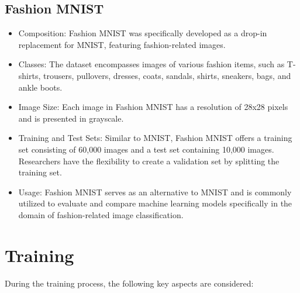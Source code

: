 \documentclass{midl} %
\begin{document}
\subsection{Fashion MNIST}
\begin{itemize}
  \item Composition: Fashion MNIST was specifically developed as a drop-in replacement for MNIST, featuring fashion-related images.
  \item Classes: The dataset encompasses images of various fashion items, such as T-shirts, trousers, pullovers, dresses, coats, sandals, shirts, sneakers, bags, and ankle boots.
  \item Image Size: Each image in Fashion MNIST has a resolution of 28x28 pixels and is presented in grayscale.
  \item Training and Test Sets: Similar to MNIST, Fashion MNIST offers a training set consisting of 60,000 images and a test set containing 10,000 images. Researchers have the flexibility to create a validation set by splitting the training set.
  \item Usage: Fashion MNIST serves as an alternative to MNIST and is commonly utilized to evaluate and compare machine learning models specifically in the domain of fashion-related image classification.
\end{itemize}

\section{Training}

During the training process, the following key aspects are considered:
\end{document}
